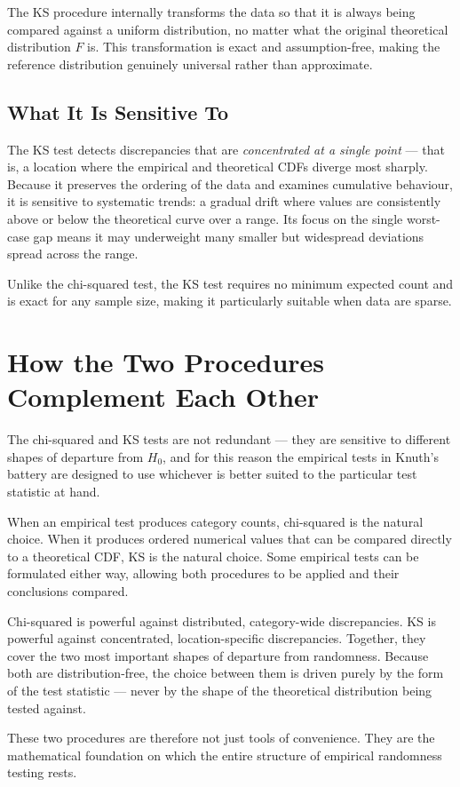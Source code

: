 \begin{keyidea}
The KS procedure internally transforms the data so that it is always being
compared against a uniform distribution, no matter what the original
theoretical distribution $F$ is.  This transformation is exact and
assumption-free, making the reference distribution genuinely universal
rather than approximate.
\end{keyidea}
 
\subsection{What It Is Sensitive To}
 
The KS test detects discrepancies that are \emph{concentrated at a single
point} --- that is, a location where the empirical and theoretical CDFs
diverge most sharply.  Because it preserves the ordering of the data and
examines cumulative behaviour, it is sensitive to systematic trends: a
gradual drift where values are consistently above or below the theoretical
curve over a range.  Its focus on the single worst-case gap means it may
underweight many smaller but widespread deviations spread across the range.
 
Unlike the chi-squared test, the KS test requires no minimum expected count
and is exact for any sample size, making it particularly suitable when data
are sparse.
 
\section{How the Two Procedures Complement Each Other}
 
The chi-squared and KS tests are not redundant --- they are sensitive to
different shapes of departure from $H_0$, and for this reason the empirical
tests in Knuth's battery are designed to use whichever is better suited to
the particular test statistic at hand.
 
When an empirical test produces category counts, chi-squared is the natural
choice.  When it produces ordered numerical values that can be compared
directly to a theoretical CDF, KS is the natural choice.  Some empirical
tests can be formulated either way, allowing both procedures to be applied
and their conclusions compared.
 
\begin{keyidea}
Chi-squared is powerful against distributed, category-wide discrepancies.
KS is powerful against concentrated, location-specific discrepancies.
Together, they cover the two most important shapes of departure from
randomness.  Because both are distribution-free, the choice between them
is driven purely by the form of the test statistic --- never by the shape
of the theoretical distribution being tested against.
\end{keyidea}
 
These two procedures are therefore not just tools of convenience.  They are
the mathematical foundation on which the entire structure of empirical
randomness testing rests.